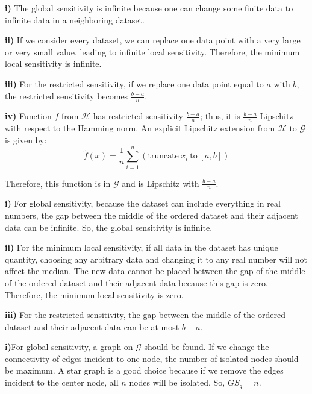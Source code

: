 \documentclass[12pt]{extarticle}
\begin{document}
\textbf{i)} The global sensitivity is infinite because one can change some finite data to infinite data in a neighboring dataset.

\textbf{ii)} If we consider every dataset, we can replace one data point with a very large or very small value, leading to infinite local sensitivity. Therefore, the minimum local sensitivity is infinite.

\textbf{iii)} For the restricted sensitivity, if we replace one data point equal to $a$ with $b$, the restricted sensitivity becomes $\frac{b-a}{n}$.

\textbf{iv)} Function \(f\) from $\mathcal{H}$ has restricted sensitivity $\frac{b-a}{n}$; thus, it is $\frac{b-a}{n}$ Lipschitz with respect to the Hamming norm. An explicit Lipschitz extension from $\mathcal{H}$ to $\mathcal{G}$ is given by:
\[\widetilde{f}(x) = \frac{1}{n}\sum_{i=1}^{n} (\text{truncate}\  x_i\  \text{to}\ [a,b])\]

Therefore, this function is in \(\mathcal{G}\) and is Lipschitz with $\frac{b-a}{n}$.
\\

\textbf{i)} For global sensitivity, because the dataset can include everything in real numbers, the gap between the middle of the ordered dataset and their adjacent data can be infinite. So, the global sensitivity is infinite.

\textbf{ii)} For the minimum local sensitivity, if all data in the dataset has unique quantity, choosing any arbitrary data and changing it to any real number will not affect the median. The new data cannot be placed between the gap of the middle of the ordered dataset and their adjacent data because this gap is zero. Therefore, the minimum local sensitivity is zero.

\textbf{iii)} For the restricted sensitivity, the gap between the middle of the ordered dataset and their adjacent data can be at most $b-a$.
\\

\textbf{i)}For global sensitivity, a graph on \(\mathcal{G}\) should be found. If we change the connectivity of edges incident to one node, the number of isolated nodes should be maximum. A star graph is a good choice because if we remove the edges incident to the center node, all \(n\) nodes will be isolated. So, \(GS_q = n\).
\end{document}
